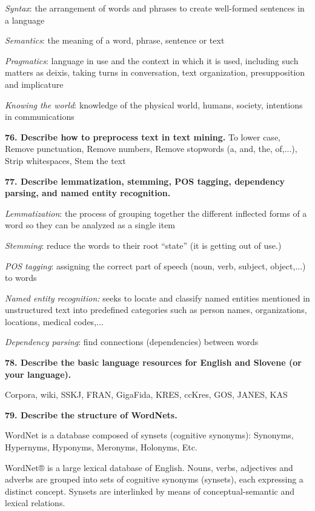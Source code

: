 \textit{Syntax}: the arrangement of words and phrases to create
well-formed sentences in a language

\textit{Semantics}: the meaning of a word, phrase, sentence or text

\textit{Pragmatics}: language in use and the context in which it is
used, including such matters as deixis, taking turns in conversation,
text organization, presupposition and implicature

\textit{Knowing the world}: knowledge of the physical world, humans,
society, intentions in communications

\textbf{76. Describe how to preprocess text in text mining.}
To lower case, Remove punctuation, Remove numbers, Remove stopwords (a, and, the, of,...), Strip whitespaces, Stem the text

\textbf{77. Describe lemmatization, stemming, POS tagging, dependency
parsing, and named entity recognition.}

\textit{Lemmatization}: the process of grouping together the
different inflected forms of a word so they can be analyzed as a single item

\textit{Stemming}: reduce the words to their root ``state'' (it is
getting out of use.)

\textit{POS tagging}: assigning the correct part of speech (noun,
verb, subject, object,...) to words

\textit{Named entity recognition:} seeks to locate and classify named
entities mentioned in unstructured text into predefined categories such
as person names, organizations, locations, medical codes,...

\textit{Dependency parsing}: find connections (dependencies) between
words

\textbf{78. Describe the basic language resources for English and
Slovene (or your language).}

Corpora, wiki, SSKJ, FRAN, GigaFida, KRES, ccKres, GOS, JANES, KAS

\textbf{79. Describe the structure of WordNets.}

WordNet is a database composed of synsets (cognitive synonyms):
Synonyms, Hypernyms, Hyponyms, Meronyms, Holonyms, Etc.

WordNet® is a large lexical database of English. Nouns, verbs,
adjectives and adverbs are grouped into sets of cognitive synonyms
(synsets), each expressing a distinct concept. Synsets are interlinked
by means of conceptual-semantic and lexical relations.

